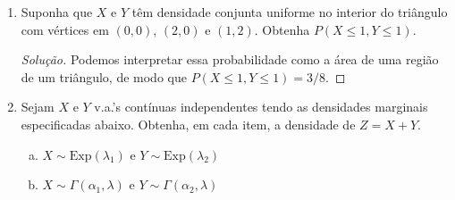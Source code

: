 \documentclass[../Notas.tex]{subfiles}
\begin{document}
\begin{enumerate}
\begin{enumerate}[a)]
    \end{enumerate}
    \begin{proof}[Solução]
        \begin{enumerate}[a)]
            \item Podemos reescrever
            \[
            f(x,y) = c\exp\left[ -\frac{1}{2}\left( x - \frac{y}{2} \right)^2 \right]
            \exp\left[-\frac{15y^2}{8}\right].
            \]
            Daí, temos
            \begin{align*}
                f_Y(y) &= \int_{\mathbb{R}} f(x,y) \, dx \\
                       &= c\exp\left[-\frac{15y^2}{8}\right]\int_{\mathbb{R}} 
                       \exp\left[-\frac{1}{2}\left(x - \frac{y}{2}\right)^2 \right] \, dx \\
                       &= c\sqrt{2\pi}e^{-15y^2/8}, \, \forall y\in\mathbb{R}.
            \end{align*}
            Devemos ter $c$ tal que a integral de $f_Y(y)$ em $y$ sobre a reta seja igual a 1,
            ou seja,
            \[
            c\sqrt{2\pi}\int_{\mathbb{R}} f_Y(y) \, dy = 1 \implies c = \frac{\sqrt{15}}{4\pi}.
            \]
            \item Do item anterior, temos que $Y\sim N(0, 4/15)$. Realizando um procedimento análogo,
            concluímos também que $X\sim N(0, 16/15)$. Observe que como $f(x,y) \neq f_X(x)f_Y(y)$
            em geral, então $X$ e $Y$ não são independentes.
        \end{enumerate}
    \end{proof}
    \item Suponha que $X$ e $Y$ têm densidade conjunta uniforme no interior do triângulo com vértices em $(0,0)$, $(2,0)$ e $(1,2)$. Obtenha $P(X \leq 1, Y \leq 1)$.
    \begin{proof}[Solução]
        Podemos interpretar essa probabilidade como a área de uma região de um triângulo, de modo que
        $P(X\leq 1, Y\leq 1) = 3/8$.
    \end{proof}
    \item Sejam $X$ e $Y$ v.a.’s contínuas independentes tendo as densidades marginais especificadas abaixo. Obtenha, em cada item, a densidade de $Z = X + Y$.
    \begin{enumerate}[a)]
    \item $X\sim\text{Exp}(\lambda_1)$ e $Y\sim\text{Exp}(\lambda_2)$
    \item $X\sim\Gamma(\alpha_1,\lambda)$ e $Y\sim\Gamma(\alpha_2, \lambda)$

\end{enumerate}
\end{enumerate}
\end{document}
